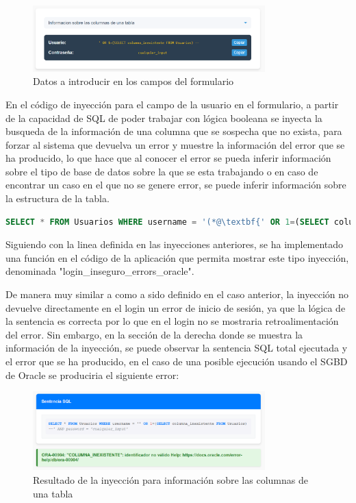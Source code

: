 \documentclass[a4paper,12pt]{article}
\begin{document}
\begin{figure}[H]
    \centering
    \includegraphics[width=0.8\textwidth]{Imagenes/error7.png}
    \caption{Datos a introducir en los campos del formulario}
\end{figure}

En el código de inyección para el campo de la usuario en el formulario,
a partir de la capacidad de SQL de poder trabajar con lógica booleana se inyecta la busqueda de la información de una columna
que se sospecha que no exista, para forzar al sistema que devuelva un error y muestre la información del error que se ha producido,
lo que hace que al conocer el error se pueda inferir información sobre el tipo de base de datos sobre la que se esta trabajando o
en caso de encontrar un caso en el que no se genere error, se puede inferir información sobre la estructura de la tabla.

\begin{lstlisting}[language=SQL]
    SELECT * FROM Usuarios WHERE username = '(*@\textbf{' OR 1=(SELECT columna\_inexistente FROM Usuarios) --}@*)' AND password = '(*@\textbf{cualquier\_input}@*)'
\end{lstlisting}

Siguiendo con la linea definida en las inyecciones anteriores, 
se ha implementado una función en el código de la aplicación que permita mostrar este tipo inyección, 
denominada "login\_inseguro\_errors\_oracle".

De manera muy similar a como a sido definido en el caso anterior, la inyección no devuelve directamente en el login un error de inicio de sesión,
ya que la lógica de la sentencia es correcta por lo que en el login no se mostraria retroalimentación del error. Sin embargo,
en la sección de la derecha donde se muestra la información de la inyección, se puede observar la sentencia SQL total ejecutada y el error que se ha producido,
en el caso de una posible ejecución usando el SGBD de Oracle se produciria el siguiente error:

\begin{figure}[H]
    \centering
    \includegraphics[width=0.8\textwidth]{Imagenes/error8.png}
    \caption{Resultado de la inyección para información sobre las columnas de una tabla}
\end{figure}
\end{document}
